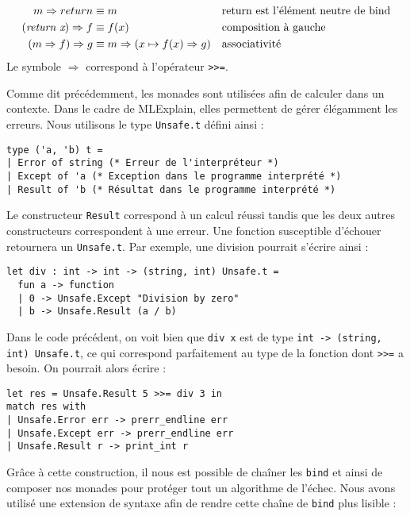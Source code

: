 \documentclass[a4paper,10pt]{report}
\begin{document}
\begin{align*}
m \Rightarrow return &\equiv m && \text{return est l'élément neutre de bind} \\
(\textit{\mbox{return x}}) \Rightarrow f &\equiv f(x) && \text{composition à 
gauche} \\
(m \Rightarrow f) \Rightarrow g &\equiv m \Rightarrow (x \mapsto f(x) 
\Rightarrow g) && \text{associativité}
\end{align*}
Le symbole $\Rightarrow$ correspond à l'opérateur \verb|>>=|.

Comme dit précédemment, les monades sont utilisées afin de calculer dans un 
contexte. Dans le cadre de MLExplain, elles permettent de gérer élégamment les 
erreurs. Nous utilisons le type \verb|Unsafe.t| défini ainsi :

\begin{verbatim}
type ('a, 'b) t =
| Error of string (* Erreur de l'interpréteur *)
| Except of 'a (* Exception dans le programme interprété *)
| Result of 'b (* Résultat dans le programme interprété *)
\end{verbatim}

Le constructeur \verb|Result| correspond à un calcul réussi tandis que les deux 
autres constructeurs correspondent à une erreur. Une fonction susceptible 
d'échouer retournera un \verb|Unsafe.t|. Par exemple, une division pourrait 
s'écrire ainsi :

\begin{verbatim}
let div : int -> int -> (string, int) Unsafe.t =
  fun a -> function
  | 0 -> Unsafe.Except "Division by zero"
  | b -> Unsafe.Result (a / b)
\end{verbatim}

Dans le code précédent, on voit bien que \verb|div x| est de type
\verb|int -> (string, int) Unsafe.t|, ce qui correspond parfaitement au type de 
la fonction dont \verb|>>=| a besoin. On pourrait alors écrire :

\begin{verbatim}
let res = Unsafe.Result 5 >>= div 3 in
match res with
| Unsafe.Error err -> prerr_endline err
| Unsafe.Except err -> prerr_endline err
| Unsafe.Result r -> print_int r
\end{verbatim}

Grâce à cette construction, il nous est possible de chaîner les \verb|bind| et 
ainsi de composer nos monades pour protéger tout un algorithme de l'échec. Nous 
avons utilisé une extension de syntaxe afin de rendre cette chaîne de 
\verb|bind| plus lisible :
\end{document}

